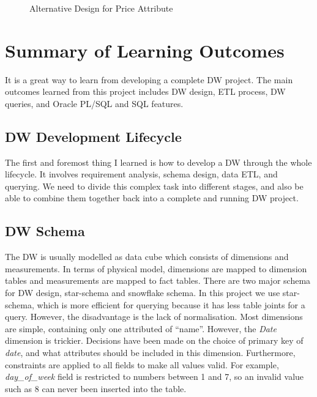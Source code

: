 \documentclass[
  a4paper,
]{article}
\begin{document}
\begin{figure}[htbp]
  \centering
  {
  \fontsize{10}{11}\selectfont
    \resizebox{0.85\textwidth}{!}{}
  }
  \caption{Alternative Design for Price Attribute}
  \label{fig:alter-price}
\end{figure}

\hypertarget{summary-of-learning-outcomes}{%
\section{Summary of Learning
Outcomes}\label{summary-of-learning-outcomes}}

It is a great way to learn from developing a complete DW project. The
main outcomes learned from this project includes DW design, ETL process,
DW queries, and Oracle PL/SQL and SQL features.

\hypertarget{dw-development-lifecycle}{%
\subsection{DW Development Lifecycle}\label{dw-development-lifecycle}}

The first and foremost thing I learned is how to develop a DW through
the whole lifecycle. It involves requirement analysis, schema design,
data ETL, and querying. We need to divide this complex task into
different stages, and also be able to combine them together back into a
complete and running DW project.

\hypertarget{dw-schema}{%
\subsection{DW Schema}\label{dw-schema}}

The DW is usually modelled as data cube which consists of dimensions and
measurements. In terms of physical model, dimensions are mapped to
dimension tables and measurements are mapped to fact tables. There are
two major schema for DW design, star-schema and snowflake schema. In
this project we use star-schema, which is more efficient for querying
because it has less table joints for a query. However, the disadvantage
is the lack of normalisation. Most dimensions are simple, containing
only one attributed of ``name''. However, the \emph{Date} dimension is
trickier. Decisions have been made on the choice of primary key of
\emph{date}, and what attributes should be included in this dimension.
Furthermore, constraints are applied to all fields to make all values
valid. For example, \emph{day\_of\_week} field is restricted to numbers
between 1 and 7, so an invalid value such as 8 can never been inserted
into the table.
\end{document}
